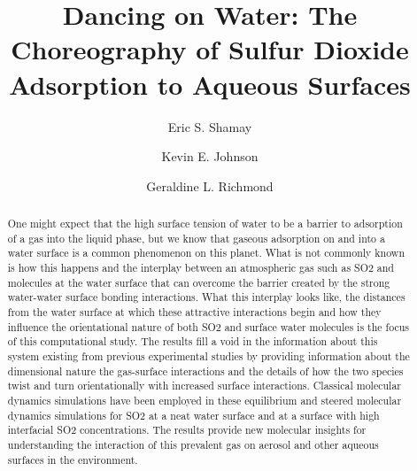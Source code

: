 \documentclass{article}
\title{Dancing on Water: The Choreography of Sulfur Dioxide Adsorption to Aqueous Surfaces}
\author{Eric S. Shamay \and Kevin E. Johnson \and Geraldine L. Richmond}
\begin{document}
\newcommand{\suldiox}{SO$_2$}
\newcommand{\ang}{\,$\textrm{\AA}$}
\newcommand{\angs}{\ang}
\newcommand{\wat}{H$_2$O}


\linenumbers 
\doublespacing


\begin{abstract}
One might expect that the high surface tension of water to be a barrier to adsorption of a gas into the liquid phase, but we know that gaseous adsorption on and into a water surface is a common phenomenon on this planet.  What is not commonly known is how this happens and the interplay between an atmospheric gas such as SO2 and molecules at the water surface that can overcome the barrier created by the strong water-water surface bonding interactions.  What this interplay looks like, the distances from the water surface at which these attractive interactions begin and how they influence the orientational nature of both SO2 and surface water molecules is the focus of this computational study.  The results fill a void in the information about this system existing from previous experimental studies by providing information about the dimensional nature the gas-surface interactions and the details of how the two species twist and turn orientationally with increased surface interactions.  Classical molecular dynamics simulations have been employed in these equilibrium and steered molecular dynamics simulations for SO2 at a neat water surface and at a surface with high interfacial SO2 concentrations.   The results provide new molecular insights for understanding the interaction of this prevalent gas on aerosol and other aqueous surfaces in the environment.
\end{abstract}







\end{document}
